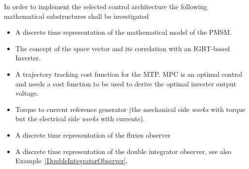 \documentclass[12pt,a4paper,oneside]{book}
\begin{document}
\begin{onehalfspace}
In order to implement the selected control architecture the following 
mathematical substructures shall be investigated
\begin{itemize}
	\item[--] A discrete time representation of the mathematical model of the 
	PMSM.
	\item[--] The concept of the space vector and its correlation with an 
	IGBT-based Inverter.
	\item[--] A trajectory tracking cost function for the MTP. MPC is an 
	optimal control and needs a cost function to be used to derive the optimal 
	inverter output voltage.
	\item[--] Torque to current reference generator (the mechanical side 
	\textit{works} with torque but the electrical side \textit{works} with 
	currents).
	\item[--] A discrete time representation of the fluxes observer
	\item[--] A discrete time representation of the double integrator observer, see also Example~\ref{DoubleIntegratorObserver}.
\end{itemize}

\end{onehalfspace}
\end{document}
